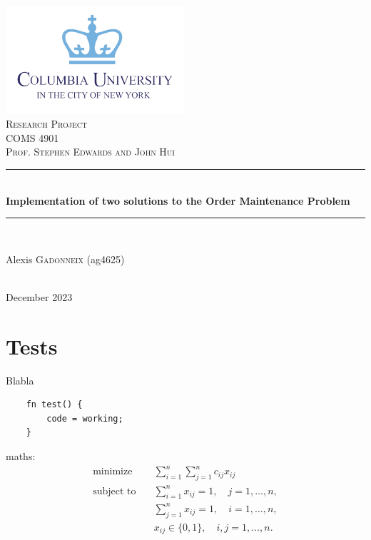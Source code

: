 \documentclass[12pt]{article}
\begin{document}
\begin{titlepage}

  \newcommand{\HRule}{\rule{\linewidth}{0.5mm}}

  \center

  \includegraphics[width=250px, keepaspectratio]{./columbia-logo.png}\\[1cm]
  \textsc{\Large Research Project}\\[0.5cm]
  \textsc{\large COMS 4901}\\[0.3cm]
  \textsc{\large Prof. Stephen Edwards and John Hui}\\[0.5cm]

  \HRule \\[0.4cm]
  { \huge \bfseries Implementation of two solutions to the Order Maintenance Problem}\\[0.4cm]
  \HRule \\[1.5cm]

  \begin{minipage}{0.4\textwidth}
    \begin{center} \large
      Alexis \textsc{Gadonneix} (ag4625)\\
    \end{center}

  \end{minipage}\\[2cm]

  {\large December 2023}\\[2cm]

  \vfill

\end{titlepage}

\section{Tests}

Blabla

\begin{lstlisting}
	fn test() {
		code = working;
	}
\end{lstlisting}

maths:
\begin{equation}
  \begin{aligned}
    \text{minimize} \quad   & \sum_{i=1}^{n} \sum_{j=1}^{n} c_{ij} x_{ij}       \\
    \text{subject to} \quad & \sum_{i=1}^{n} x_{ij} = 1, \quad j = 1, \dots, n, \\
                            & \sum_{j=1}^{n} x_{ij} = 1, \quad i = 1, \dots, n, \\
                            & x_{ij} \in \{0, 1\}, \quad i,j = 1, \dots, n.
  \end{aligned}
\end{equation}
\end{document}

